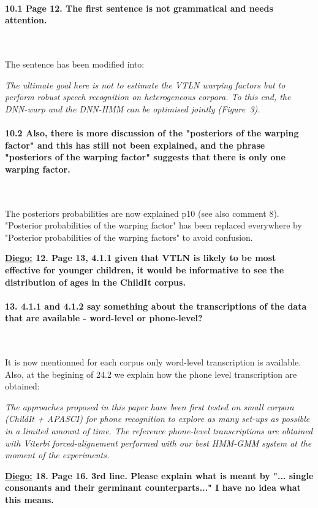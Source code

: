 \documentclass[]{article}
\begin{document}
\paragraph{10.1 Page 12. The first sentence is not grammatical and needs attention.}

~

The sentence has been modified into:

\textit{The ultimate goal here is not to estimate the VTLN warping factors but to perform robust speech recognition on heterogeneous corpora. To this end, the DNN-warp and the DNN-HMM can be optimised jointly (Figure~3).}

\paragraph{10.2 Also, there is more discussion of the "posteriors of the warping factor" and this has still not been explained, and the phrase "posteriors of the warping factor" suggests that there is only one warping factor.}

~

The posteriors probabilities are now explained p10 (see also comment 8). "Posterior probabilities of the warping factor" has been replaced everywhere by "Posterior probabilities of the warping factors" to avoid confusion.

\textbf{\underline{Diego:} 12. Page 13, 4.1.1 given that VTLN is likely to be most effective for younger children, it would be informative to see the distribution of ages in the ChildIt corpus.}
\paragraph{13. 4.1.1 and 4.1.2 say something about the transcriptions of the data that are available - word-level or phone-level?}

~

It is now mentionned for each corpus only word-level transcription is available. Also, at the begining of 24.2 we explain how the phone level transcription are obtained:

\textit{The approaches proposed in this paper have been first tested on small corpora (ChildIt + APASCI) for phone recognition to explore as many set-ups as possible in a limited amount of time. The reference phone-level transcriptions are obtained with Viterbi forced-alignement performed with our best HMM-GMM system at the moment of the experiments.}

\textbf{\underline{Diego:} 18. Page 16. 3rd line. Please explain what is meant by "... single consonants and their germinant counterparts..." I have no idea what this means.}
\end{document}
